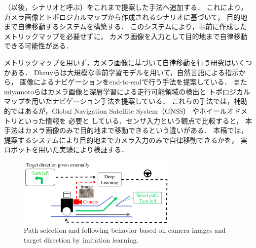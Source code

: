\documentclass{sice-si}
\begin{document}
（以後，シナリオと呼ぶ）をこれまで提案した手法へ追加する．
これにより，カメラ画像とトポロジカルマップから作成されるシナリオに基づいて，
目的地まで自律移動するシステムを構築する．
このシステムにより，事前に作成したメトリックマップを必要せずに，
カメラ画像を入力として目的地まで自律移動できる可能性がある．
\par
メトリックマップを用いず，カメラ画像に基づいて自律移動を行う研究はいくつかある．
Dhruvら\cite{shah2022lmnav}は大規模な事前学習モデルを用いて，自然言語による指示から，
画像によるナビゲーションをend-to-endで行う手法を提案している．
またmiyamotoら\cite{seg_meizi}はカメラ画像と深層学習による走行可能領域の検出と
トポロジカルマップを用いたナビゲーション手法を提案している．
これらの手法では，補助的ではあるが，Global Navigation Satellite System（GNSS）
やホイールオドメトリといった情報を
必要と
している．センサ入力という観点で比較すると，
本手法はカメラ画像のみで目的地まで移動できるという違いがある．
本稿では，提案するシステムにより目的地までカメラ入力のみで自律移動できるかを，
実ロボットを用いた実験により検証する．
\begin{figure}[h]
    \centering
     \includegraphics[height=33mm,width=78mm]{./figs/camera_base.pdf}
     \caption{Path selection and following behavior based on camera images and
     target direction by imitation learning.}\label{fig:camera_base}
\end{figure}
\end{document}
